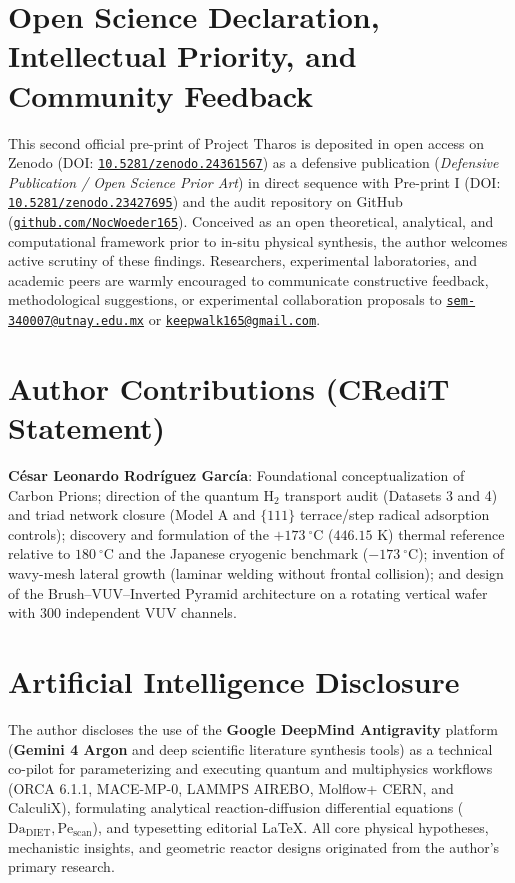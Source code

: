 \documentclass[10pt,twocolumn,a4paper]{article}
\begin{document}
\section*{Open Science Declaration, Intellectual Priority, and Community Feedback}
This second official pre-print of Project Tharos is deposited in open access on Zenodo (DOI: \href{https://doi.org/10.5281/zenodo.24361567}{\texttt{10.5281/zenodo.24361567}}) as a defensive publication (\textit{Defensive Publication / Open Science Prior Art}) in direct sequence with Pre-print I (DOI: \href{https://doi.org/10.5281/zenodo.23427695}{\texttt{10.5281/zenodo.23427695}}) and the audit repository on GitHub (\href{https://github.com/NocWoeder165}{\texttt{github.com/NocWoeder165}}). Conceived as an open theoretical, analytical, and computational framework prior to in-situ physical synthesis, the author welcomes active scrutiny of these findings. Researchers, experimental laboratories, and academic peers are warmly encouraged to communicate constructive feedback, methodological suggestions, or experimental collaboration proposals to \href{mailto:sem-340007@utnay.edu.mx}{\texttt{sem-340007@utnay.edu.mx}} or \href{mailto:keepwalk165@gmail.com}{\texttt{keepwalk165@gmail.com}}.

\section*{Author Contributions (CRediT Statement)}
\textbf{C\'esar Leonardo Rodr\'iguez Garc\'ia}: Foundational conceptualization of Carbon Prions; direction of the quantum $\text{H}_2$ transport audit (Datasets 3 and 4) and triad network closure (Model A and $\{111\}$ terrace/step radical adsorption controls); discovery and formulation of the $+173\ ^\circ\text{C}$ ($446.15\text{ K}$) thermal reference relative to $180\ ^\circ\text{C}$ and the Japanese cryogenic benchmark ($-173\ ^\circ\text{C}$); invention of wavy-mesh lateral growth (laminar welding without frontal collision); and design of the Brush--VUV--Inverted Pyramid architecture on a rotating vertical wafer with $300$ independent VUV channels.

\section*{Artificial Intelligence Disclosure}
The author discloses the use of the \textbf{Google DeepMind Antigravity} platform (\textbf{Gemini 4 Argon} and deep scientific literature synthesis tools) as a technical co-pilot for parameterizing and executing quantum and multiphysics workflows (ORCA 6.1.1, MACE-MP-0, LAMMPS AIREBO, Molflow+ CERN, and CalculiX), formulating analytical reaction-diffusion differential equations ($\text{Da}_{\text{DIET}}, \text{Pe}_{\text{scan}}$), and typesetting editorial \LaTeX. All core physical hypotheses, mechanistic insights, and geometric reactor designs originated from the author's primary research.
\end{document}
